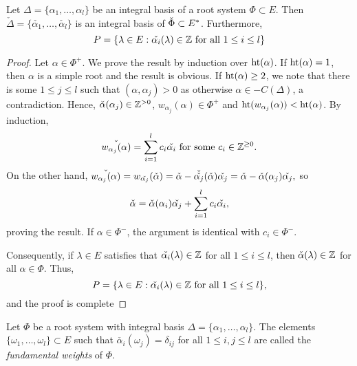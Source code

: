\begin{lemma}
    Let $\Delta=\{\alpha_1,\ldots,\alpha_l\}$ be an integral basis of a root system $\Phi\subset E$. Then $\check{\Delta}=\{\check{\alpha_1},\ldots,\check{\alpha_l}\}$ is an integral basis of $\check{\Phi}\subset E^*$. Furthermore,
    $$P=\{\lambda\in E:\check{\alpha_i}(\lambda)\in\mathbb{Z}\text{ for all }1\leq i\leq l\}$$
\end{lemma}
\begin{proof}
    Let $\alpha\in\Phi^+$. We prove the result by induction over $\mathrm{ht}(\alpha)$. If $\mathrm{ht}(\alpha)=1$, then $\alpha$ is a simple root and the result is obvious. If $\mathrm{ht}(\alpha)\geq2$, we note that there is some $1\leq j\leq l$ such that $(\alpha,\alpha_j)>0$ as otherwise $\alpha\in -C(\Delta)$, a contradiction. Hence, $\check{\alpha}(\alpha_j)\in\mathbb{Z}^{>0}$, $w_{\alpha_j}(\alpha)\in\Phi^+$ and $\mathrm{ht}(w_{\alpha_j}(\alpha))<\mathrm{ht}(\alpha)$. By induction, $$\check{w_{\alpha_j}(\alpha)}=\sum_{i=1}^{l}c_i\check{\alpha_i}\text{ for some }c_i\in\mathbb{Z}^{\geq0}.$$
    On the other hand, $\check{w_{\alpha_j}(\alpha)}=w_{\check{\alpha_j}}(\check{\alpha})=\check{\alpha}-\check{\check{\alpha_j}}(\check{\alpha})\check{\alpha_j}=\check{\alpha}-\check{\alpha}(\alpha_j)\check{\alpha_j},$ so 
    $$\check{\alpha}=\check{\alpha}(\alpha_i)\check{\alpha_j}+\sum_{i=1}^{l}c_i\check{\alpha_i},$$
    proving the result. If $\alpha\in\Phi^-$, the argument is identical with $c_i\in\Phi^-$.

    Consequently, if $\lambda\in E$ satisfies that $\check{\alpha_i}(\lambda)\in\mathbb{Z}$ for all $1\leq i\leq l$, then $\check{\alpha}(\lambda)\in\mathbb{Z}$ for all $\alpha\in\Phi$. Thus, 
    $$P=\{\lambda\in E:\check{\alpha_i}(\lambda)\in\mathbb{Z}\text{ for all }1\leq i\leq l\},$$
    and the proof is complete
\end{proof}


\begin{definition}
    Let $\Phi$ be a root system with integral basis $\Delta=\{\alpha_1,\ldots,\alpha_l\}$. The elements $\{\omega_1,\ldots,\omega_l\}\subset E$ such that $\check{\alpha_i}(\omega_j)=\delta_{ij}$ for all $1\leq i,j\leq l$ are called the \textit{fundamental weights} of $\Phi$.
\end{definition}

